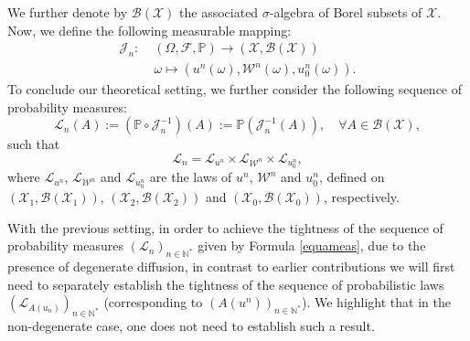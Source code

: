 \documentclass[10pt,number,preprint,times]{elsarticle}
\numberwithin{equation}{section} %
\begin{document}
We further denote by $\mathcal{B}(\mathscr{X})$ the associated $\sigma$-algebra of Borel subsets of $\mathscr{X}$. Now, we define the following measurable mapping: 
\begin{align*}
	\mathscr{J}_n :\; &(\Omega,\mathcal{F},\mathbb{P}) \rightarrow (\mathscr{X},\mathcal{B}(\mathscr{X}))\\
	&\omega \mapsto \left(u^n(\omega),\mathcal{W}^n(\omega),u_0^n(\omega)\right).
\end{align*}
To conclude our theoretical setting, we further consider the following sequence of probability measures: 
\begin{equation}\label{equameas}
	\mathscr{L}_n(A):=\left(\mathbb{P}\circ \mathscr{J}_n^{-1}\right)(A):=\mathbb{P}\left( \mathscr{J}_n^{-1}(A)\right), \quad \forall A \in \mathcal{B}(\mathscr{X}),
\end{equation}
such that
$$
\mathscr{L}_n=\mathscr{L}_{u^n} \times \mathscr{L}_{\mathcal{W}^n} \times \mathscr{L}_{u^n_0},
$$
where $\mathscr{L}_{u^n}$, $\mathscr{L}_{\mathcal{W}^n}$ and $\mathscr{L}_{u^n_0}$ are the laws of $u^n$, $\mathcal{W}^n$ and $u^n_0$, defined on $\left(\mathscr{X}_1,\mathcal{B}(\mathscr{X}_1)\right)$, $\left(\mathscr{X}_2,\mathcal{B}(\mathscr{X}_2)\right)$ and $\left(\mathscr{X}_0,\mathcal{B}(\mathscr{X}_0)\right)$, respectively.






With the previous setting, in order to achieve the tightness of the sequence of probability measures $\left(\mathscr{L}_n\right)_{n \in \mathbb{N}^*}$ given by Formula \eqref{equameas}, due to the presence of degenerate diffusion, in contrast to earlier contributions we will first need to separately establish the tightness of the sequence of probabilistic laws ${\left(\mathcal{L}_{A(u_{n})}\right)}_{n \in \mathbb{N}^*}$ (corresponding to $\left(A(u^n)\right)_{n \in \mathbb{N}^*}$). We highlight that in the non-degenerate case, one does not need to establish such a result. 
\end{document}
